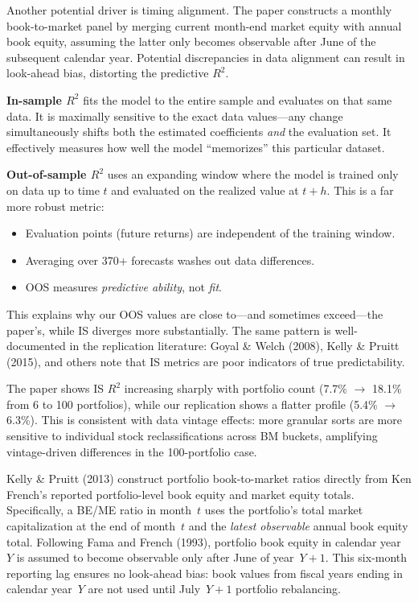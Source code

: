 \documentclass[10pt,letterpaper]{handout}
\begin{document}

Another potential driver is timing alignment. The paper constructs a monthly book-to-market panel by merging current month-end market equity with annual book equity,  assuming the latter only becomes observable after June of the subsequent calendar year. Potential discrepancies in data alignment can result in look-ahead bias, distorting the predictive $R^2$.


\textbf{In-sample $R^2$} fits the model to the entire sample and evaluates on that same data. It is maximally sensitive to the exact data values---any change simultaneously shifts both the estimated coefficients \textit{and} the evaluation set. It effectively measures how well the model ``memorizes'' this particular dataset.

\smallskip
\textbf{Out-of-sample $R^2$} uses an expanding window where the model is trained only on data up to time $t$ and evaluated on the realized value at $t+h$. This is a far more robust metric:
\begin{itemize}
  \item Evaluation points (future returns) are independent of the training window.
  \item Averaging over 370+ forecasts washes out data differences.
  \item OOS measures \textit{predictive ability}, not \textit{fit}.
\end{itemize}
This explains why our OOS values are close to---and sometimes exceed---the paper's, while IS diverges more substantially. The same pattern is well-documented in the replication literature: Goyal \& Welch (2008), Kelly \& Pruitt (2015), and others note that IS metrics are poor indicators of true predictability.


The paper shows IS $R^2$ increasing sharply with portfolio count (7.7\% $\to$ 18.1\% from 6 to 100 portfolios), while our replication shows a flatter profile (5.4\% $\to$ 6.3\%). This is consistent with data vintage effects: more granular sorts are more sensitive to individual stock reclassifications across BM buckets, amplifying vintage-driven differences in the 100-portfolio case.


Kelly \& Pruitt (2013) construct portfolio book-to-market ratios directly from Ken French's reported portfolio-level book equity and market equity totals. Specifically, a BE/ME ratio in month~$t$ uses the portfolio's total market capitalization at the end of month~$t$ and the \textit{latest observable} annual book equity total. Following Fama and French (1993), portfolio book equity in calendar year~$Y$ is assumed to become observable only after June of year~$Y+1$. This six-month reporting lag ensures no look-ahead bias: book values from fiscal years ending in calendar year~$Y$ are not used until July~$Y+1$ portfolio rebalancing.
\end{document}
